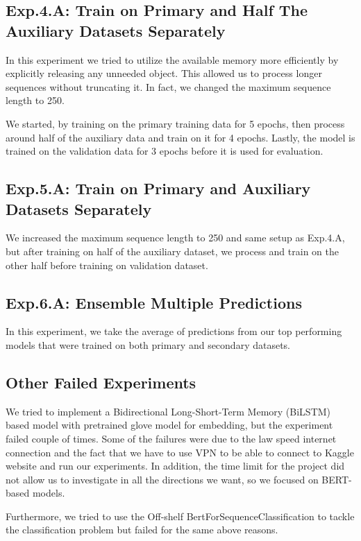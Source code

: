\documentclass[10pt,twocolumn,letterpaper]{article}
\begin{document}
\subsection{Exp.4.A: Train on Primary and Half The Auxiliary Datasets Separately}

In this experiment we tried to utilize the available memory more efficiently by explicitly releasing any unneeded object. This allowed us to process longer sequences without truncating it. In fact, we changed the maximum sequence length to 250. 

We started, by training on the primary training data for 5 epochs, then process around half of the auxiliary data and train on it for 4 epochs. Lastly, the model is trained on the validation data for 3 epochs before it is used for evaluation. 

\subsection{Exp.5.A: Train on Primary and Auxiliary Datasets Separately} 

We increased the maximum sequence length to 250 and same setup as Exp.4.A, but after training on half of the auxiliary dataset, we process and train on the other half before training on validation dataset.

\subsection{Exp.6.A: Ensemble Multiple Predictions}

In this experiment, we take the average of predictions from our top performing models that were trained on both primary and secondary datasets. 

\subsection{Other Failed Experiments}
We tried to implement a Bidirectional Long-Short-Term Memory (BiLSTM) based model with pretrained glove model for embedding, but the experiment failed couple of times. Some of the failures were due to the law speed internet  connection and the fact that we have to use VPN to be able to connect to Kaggle website and run our experiments. In addition, the time limit for the project did not allow us to investigate in all the directions we want, so we focused on BERT-based models.

Furthermore, we tried to use the Off-shelf BertForSequenceClassification to tackle the classification problem but failed for the same above reasons.   
\end{document}
